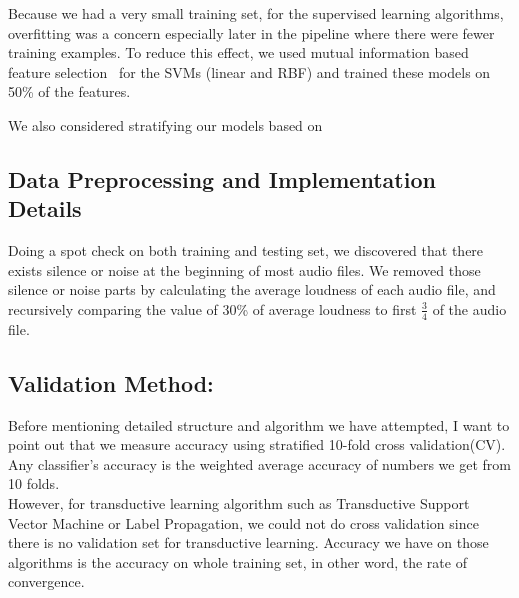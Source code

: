 Because we had a very small training set, for the supervised learning algorithms, overfitting was a concern especially later in the pipeline where there were fewer training examples. To reduce this effect, we used mutual information based feature selection~\cite{} for the SVMs (linear and RBF) and trained these models on 50\% of the features.

We also considered stratifying our models based on 
\subsection{Data Preprocessing and Implementation Details}
	Doing a spot check on both training and testing set, we discovered that there exists silence or noise at the beginning of most audio files. We removed those silence or noise parts by calculating the average loudness of each audio file, and recursively comparing the value of 30\% of average loudness to first $\frac{3}{4}$ of the audio file.

\subsection{Validation Method:}
Before mentioning detailed structure and algorithm we have attempted, I want to point out that we measure accuracy using stratified 10-fold cross validation(CV). Any classifier's accuracy is the weighted average accuracy of numbers we get from 10 folds.  \\
\indent However, for transductive learning algorithm such as Transductive Support Vector Machine or Label Propagation, we could not do cross validation since there is no validation set for transductive learning. Accuracy we have on those algorithms is the accuracy on whole training set, in other word, the rate of convergence. 

